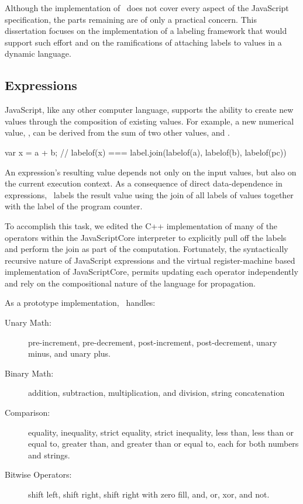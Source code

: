 Although the implementation of \FlowCore\ does not cover every aspect of the JavaScript specification, the parts remaining are of only a practical concern.
This dissertation focuses on the implementation of a labeling framework that would support such effort and on the ramifications of attaching labels to values in a dynamic language.

\subsection{Expressions}

JavaScript, like any other computer language, supports the ability to create new values through the composition of existing values.
For example, a new numerical value, , can be derived from the sum of two other values,  and .

\begin{jscode}
var x = a + b;
// labelof(x) === label.join(labelof(a), labelof(b), labelof(pc))
\end{jscode}

An expression's resulting value depends not only on the input values, but also on the current execution context.
As a consequence of direct data-dependence in expressions, \FlowCore\ labels the result value using the join of all labels of values together with the label of the program counter.

To accomplish this task, we edited the C++ implementation of many of the operators within the JavaScriptCore interpreter to explicitly pull off the labels and perform the join as part of the computation.
Fortunately, the syntactically recursive nature of JavaScript expressions and the virtual register-machine based implementation of JavaScriptCore, permits updating each operator independently and rely on the compositional nature of the language for propagation.

As a prototype implementation, \FlowCore\ handles:
\begin{description}
  \item[Unary Math:] pre-increment, pre-decrement, post-increment, post-decrement, unary minus, and unary plus.
  \item[Binary Math:] addition, subtraction, multiplication, and division, string concatenation
  \item[Comparison:] equality, inequality, strict equality, strict inequality, less than, less than or equal to, greater than, and greater than or equal to, each for both numbers and strings.
  \item[Bitwise Operators:] shift left, shift right, shift right with zero fill, and, or, xor, and not.
\end{description}

